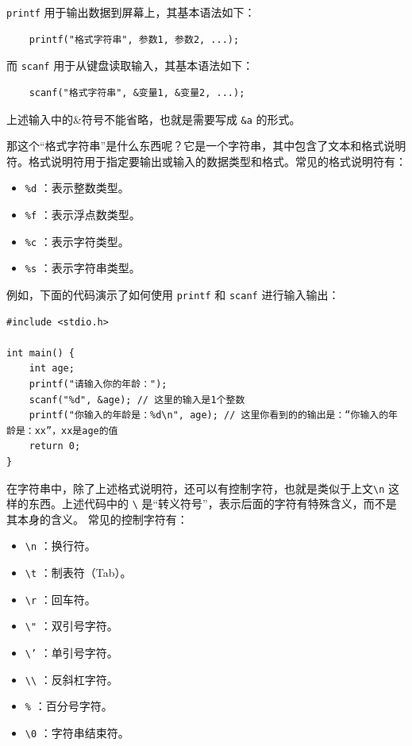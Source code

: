 \texttt{printf} 用于输出数据到屏幕上，其基本语法如下：
\begin{verbatim}
    printf("格式字符串", 参数1, 参数2, ...);
\end{verbatim}

而 \texttt{scanf} 用于从键盘读取输入，其基本语法如下：
\begin{verbatim}
    scanf("格式字符串", &变量1, &变量2, ...);
\end{verbatim}
上述输入中的\&符号不能省略，也就是需要写成 \texttt{\&a} 的形式。

那这个“格式字符串”是什么东西呢？它是一个字符串，其中包含了文本和格式说明符。格式说明符用于指定要输出或输入的数据类型和格式。常见的格式说明符有：
\begin{itemize}
  \item \texttt{\%d} ：表示整数类型。
  \item \texttt{\%f} ：表示浮点数类型。
  \item \texttt{\%c} ：表示字符类型。
  \item \texttt{\%s} ：表示字符串类型。
\end{itemize}

例如，下面的代码演示了如何使用 \texttt{printf} 和 \texttt{scanf} 进行输入输出：
\begin{verbatim}
#include <stdio.h>

int main() {
    int age;
    printf("请输入你的年龄：");
    scanf("%d", &age); // 这里的输入是1个整数
    printf("你输入的年龄是：%d\n", age); // 这里你看到的的输出是：“你输入的年龄是：xx”，xx是age的值
    return 0;
}
\end{verbatim}

在字符串中，除了上述格式说明符，还可以有控制字符，也就是类似于上文\texttt{\textbackslash n} 这样的东西。上述代码中的 \texttt{\textbackslash} 是“转义符号”，表示后面的字符有特殊含义，而不是其本身的含义。
常见的控制字符有：
\begin{itemize}
  \item \texttt{\textbackslash n} ：换行符。
  \item \texttt{\textbackslash t} ：制表符（Tab）。
  \item \texttt{\textbackslash r} ：回车符。
  \item \texttt{\textbackslash "} ：双引号字符。
  \item \texttt{\textbackslash '} ：单引号字符。
  \item \texttt{\textbackslash \textbackslash} ：反斜杠字符。
  \item \texttt{\%} ：百分号字符。
  \item \texttt{\textbackslash 0} ：字符串结束符。
\end{itemize}

